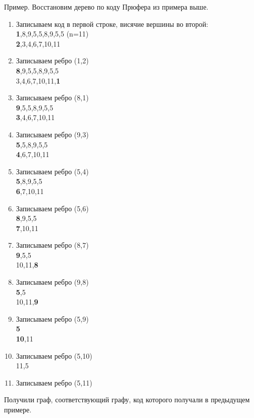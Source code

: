 Пример. Восстановим дерево по коду Прюфера из примера выше.
\begin{multicols}{2}
    \begin{enumerate}[left=0.0em, labelsep=1em, topsep=0.0em, itemsep=0pt, parsep=0.5em]
        \item Записываем код в первой строке, висячие вершины во второй:\\
        \textbf{1},8,9,5,5,8,9,5,5 (n=11)\\
        \textbf{2},3,4,6,7,10,11
        \item Записываем ребро (1,2)\\
        \textbf{8},9,5,5,8,9,5,5\\
        3,4,6,7,10,11,\textbf{1}
        \item Записываем ребро (8,1)\\
        \textbf{9},5,5,8,9,5,5\\
        \textbf{3},4,6,7,10,11
        \item Записываем ребро (9,3)\\
        \textbf{5},5,8,9,5,5\\
        \textbf{4},6,7,10,11
        \item Записываем ребро (5,4)\\
        \textbf{5},8,9,5,5\\
        \textbf{6},7,10,11
        \item Записываем ребро (5,6)\\
        \textbf{8},9,5,5\\
        \textbf{7},10,11
        \item Записываем ребро (8,7)\\
        \textbf{9},5,5\\
        10,11,\textbf{8}
        \item Записываем ребро (9,8)\\
        \textbf{5},5\\
        10,11,\textbf{9}
        \item Записываем ребро (5,9)\\
        \textbf{5}\\
        \textbf{10},11
        \item Записываем ребро (5,10)\\
        11,5
        \item Записываем ребро (5,11)
    \end{enumerate}
\end{multicols}

Получили граф, соответствующий графу, код которого получали в
предыдущем примере.